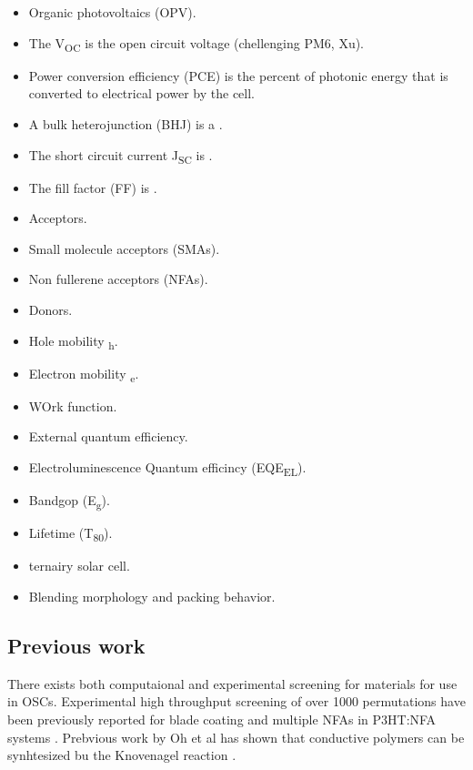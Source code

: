 \begin{itemize}
\item Organic photovoltaics (OPV).
\item The V\textsubscript{OC} is the open circuit voltage (chellenging PM6, Xu).
\item Power conversion efficiency (PCE) is the percent of photonic energy that is converted to electrical power by the cell.
\item A bulk heterojunction (BHJ) is a .
\item The short circuit current J\textsubscript{SC} is .
\item The fill factor (FF) is .
\item Acceptors.
\item Small molecule acceptors (SMAs).
\item Non fullerene acceptors (NFAs).
\item Donors.
\item Hole mobility \textmugreek\textsubscript{h}.
\item Electron mobility \textmugreek\textsubscript{e}.
\item WOrk function.
\item External quantum efficiency.
\item Electroluminescence Quantum efficincy (EQE\textsubscript{EL}).
\item Bandgop (E\textsubscript{g}).
\item Lifetime (T\textsubscript{80}).
\item ternairy solar cell.
\item Blending morphology and packing behavior.
\end{itemize}

\subsection{Previous work}
There exists both computaional and experimental screening for  materials for use in OSCs.
Experimental high throughput screening of over 1000 permutations have been previously reported for blade coating and multiple NFAs in P3HT:NFA systems \autocite{pascual-san-joseBladeCoatedP3HT2019}.
Prebvious work by Oh et al has shown that conductive polymers can be synhtesized bu the Knovenagel reaction \autocite{ohSynthesisConjugatedPolymer2021}.
